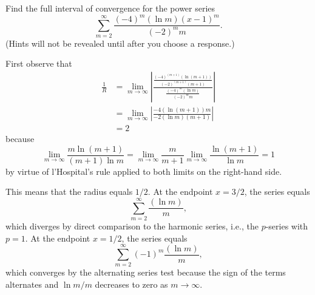 \documentclass{ximera}
\begin{document}
\begin{question}%

Find the full interval of convergence for the power series \[\sum_{m=2}^{\infty} \frac{(-4)^m(\ln m)(x - 1)^m }{(-2)^mm}.\]
(Hints will not be revealed until after you choose a response.)
\begin{multiplechoice}
\choice[correct]{\(\displaystyle \left[\frac{1}{2},\frac{3}{2}\right)\)}
\choice{\(\displaystyle \left(-1,3\right]\)}
\choice{\(\displaystyle \left[-1,3\right]\)}
\choice{\(\displaystyle \left(-\infty,\infty\right)\)}
\end{multiplechoice}
\begin{feedback}
First observe that 
\[\begin{aligned}
\frac{1}{R} & = \lim_{m\rightarrow \infty} \left| \frac{\frac{(-4)^{(m+1)}(\ln {(m+1)}) }{(-2)^{(m+1)}{(m+1)}} }{\frac{(-4)^m(\ln m) }{(-2)^mm}} \right| \\
& = \lim_{m\rightarrow \infty} \left| \frac{-4(\ln {(m+1)})m }{-2(\ln m){(m+1)} } \right| \\
& = 2
\end{aligned}\]
because \[\lim_{m \rightarrow \infty} \frac{m\ln (m+1)}{(m+1) \ln m} = \lim_{m \rightarrow \infty} \frac{m}{m+1} \lim_{m \rightarrow \infty} \frac{\ln (m+1)}{\ln m} = 1\] by virtue of l'Hospital's rule applied to both limits on the right-hand side. \begin{hint}
This means that the radius equals \(1/2\). At the endpoint \(x=3/2\), the series equals \[\sum_{m=2}^{\infty} \frac{(\ln m) }{m },\] which diverges by direct comparison to the harmonic series, i.e., the \(p\)-series with \(p = 1\). At the endpoint \(x=1/2\), the series equals \[\sum_{m=2}^{\infty} (-1)^m\frac{(\ln m) }{m },\] which converges by the alternating series test because the sign of the terms alternates and \(\ln m / m\) decreases to zero as \(m \rightarrow \infty\). \end{hint}
\end{feedback}

\end{question}
\end{document}
